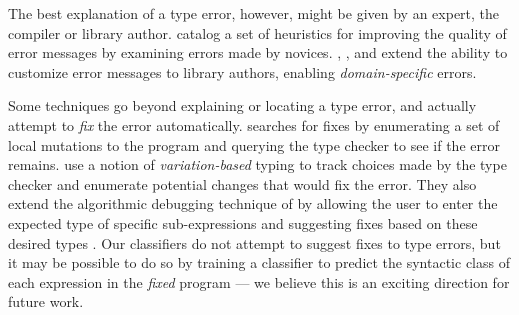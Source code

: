 %
The best explanation of a type error, however, might be given by an
expert, \eg the compiler or library author.
%
\citet{Hage2006-hc} catalog a set of heuristics for
improving the quality of error messages by examining errors made by
novices.
%
\citet{Heeren2003-db}, \citet{Christiansen2014-qc}, and
\citet{Serrano2016-oo} extend the ability to customize error messages to
library authors, enabling \emph{domain-specific} errors.
%


Some techniques go beyond explaining or locating a type error,
and actually attempt to \emph{fix} the error automatically.
%
\citet{Lerner2007-dt} searches for fixes by enumerating a
set of local mutations to the program and querying the type checker to
see if the error remains.
%
\citet{Chen2014-gd} use a notion of \emph{variation-based} typing to
track choices made by the type checker and enumerate potential
changes that would fix the error.
%
They also extend the algorithmic debugging technique of
\citeauthor{Chitil2001-td} by allowing the user to enter the expected
type of specific sub-expressions and suggesting fixes based on these
desired types \citeyear{Chen2014-vm}.
%
Our classifiers do not attempt to suggest fixes to type errors, but it
may be possible to do so by training a classifier to predict the
syntactic class of each expression in the \emph{fixed} program --- we
believe this is an exciting direction for future work.

